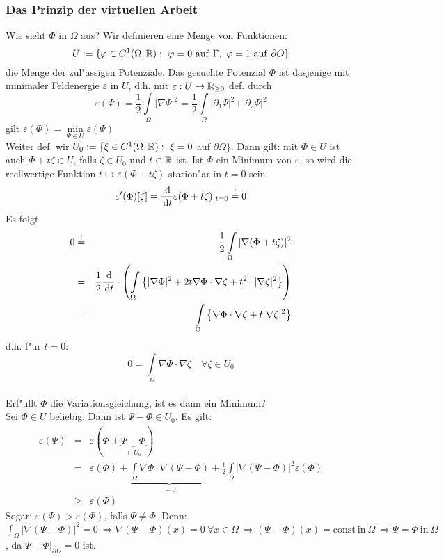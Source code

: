 \documentclass{scrartcl}
\begin{document}
\subsubsection{Das Prinzip der virtuellen Arbeit}
Wie sieht $\Phi$ in $\Omega$ aus?
Wir definieren eine Menge von Funktionen:
$$U := \{ \varphi \in C^1(\Omega, \mathbb{R}): \ \varphi = 0 \mathrm{\ auf \ } \Gamma, \ \varphi = 1 \mathrm{\ auf \ } \partial O \}$$
die Menge der zul"assigen Potenziale. Das gesuchte Potenzial $\Phi$ ist dasjenige mit minimaler Feldenergie $\varepsilon$ in $U$, d.h. mit $\varepsilon: U \rightarrow \mathbb{R}_{\geq 0}$ def. durch
$$ \varepsilon(\Psi) = \frac{1}{2} \int\limits_{\Omega} \vert \nabla \Psi \vert ^2 = \frac{1}{2} \int\limits_{\Omega} \vert \partial_1 \Psi \vert^2 + \vert \partial_2 \Psi \vert^2$$ gilt $\varepsilon(\Phi) = \min\limits_{\Psi \in U} \varepsilon (\Psi)$ \\
Weiter def. wir $U_0 := \{ \xi \in C^1(\Omega, \mathbb{R}): \ \xi = 0$ auf $\partial \Omega \}$. Dann gilt: mit $\Phi \in U$ ist auch $\Phi + t\zeta \in U$, falls $\zeta \in U_0$ und $t \in \mathbb{R}$ ist. Ist $\Phi$ ein Minimum von $\varepsilon$, so wird die reellwertige Funktion $t \mapsto \varepsilon(\Phi + t\zeta)$ station"ar in $t = 0$ sein.
$$ \varepsilon'(\Phi)[\zeta] = \frac{\, \mathrm{d}}{\, \mathrm{d} t} \varepsilon( \Phi + t \zeta) \vert_{t=0} \stackrel{!}{=} 0$$
Es folgt
\begin{eqnarray*}
0 & \stackrel{!}{=} & \frac{1}{2} \int\limits_{\Omega} \vert \nabla(\Phi + t \zeta) \vert ^2 \\
  & = & \frac{1}{2} \frac{\, \mathrm{d} }{\, \mathrm{d} t} \cdot \left( \int\limits_{\Omega} \left\{ \vert \nabla \Phi \vert ^2 + 2 t \nabla \Phi \cdot \nabla \zeta + t^2 \cdot \vert \nabla \zeta \vert ^2 \right\} \right) \\
  & = & \int\limits_{\Omega} \left\{ \nabla \Phi \cdot \nabla \zeta + t \vert \nabla \zeta \vert ^2 \right\}
\end{eqnarray*}
d.h. f"ur $t = 0:$
$$ 0 = \int\limits_{\Omega} \nabla \Phi \cdot \nabla \zeta \quad \forall \zeta \in U_0$$ \\
Erf"ullt $\Phi$ die Variationsgleichung, ist es dann ein Minimum? \\
Sei $\Phi \in U$ beliebig. Dann ist $\Psi - \Phi \in U_0$. Es gilt:
\begin{eqnarray*}
\varepsilon(\Psi) & = & \varepsilon(\Phi + \underbrace{\Psi - \Phi}_{\in U_0}) \\
& = & \varepsilon(\Phi) + \underbrace{\int\limits_{\Omega} \nabla \Phi \cdot \nabla( \Psi-\Phi)}_{=0} + \frac{1}{2} {\int\limits_{\Omega} \vert \nabla ( \Psi - \Phi)} \vert ^2 \varepsilon(\Phi) \\
& \geq & \varepsilon(\Phi)
\end{eqnarray*}
Sogar: $\varepsilon(\Psi) > \varepsilon(\Phi)$, falls $\Psi \neq \Phi$. Denn: $\int_{\Omega} \vert \nabla(\Psi-\Phi) \vert ^2 = 0 \ \Rightarrow \nabla(\Psi - \Phi)(x) = 0 \ \forall x \in \Omega \ \Rightarrow (\Psi - \Phi)(x) = \mathrm{const \ in \ } \Omega \ \Rightarrow \Psi = \Phi \mathrm{ \ in \ } \Omega$, da $\Psi - \Phi \vert _{\partial \Omega} = 0$ ist.
\end{document}
